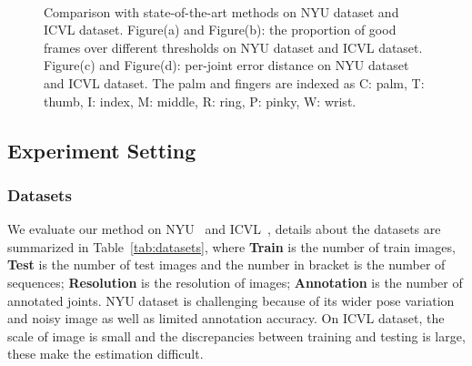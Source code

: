 \documentclass[journal,comsoc]{IEEEtran}
\let\MYoriglatexcaption\caption
\renewcommand{\caption}[2][\relax]{\MYoriglatexcaption[#2]{#2}}
\begin{document}
\begin{figure*}[t]\footnotesize
\centering
    \\
    \caption{Comparison with state-of-the-art methods on NYU dataset and ICVL dataset. Figure(a) and Figure(b): the
    proportion of good frames over different thresholds on NYU dataset and ICVL dataset. Figure(c) and Figure(d):
    per-joint error distance on NYU dataset and ICVL dataset. The palm and fingers are indexed as C: palm, T:
    thumb, I: index, M: middle, R: ring, P: pinky, W: wrist.}
    \label{fig:Results}
\end{figure*}

\subsection{Experiment Setting}\label{sec:experiment setting}
\subsubsection{Datasets}\label{sec:datasets}
We evaluate our method on NYU~\cite{tompson2014real} and ICVL~\cite{tang2014latent}, details about the datasets
are summarized in Table~\ref{tab:datasets}, where \textbf{Train} is the number of train images, \textbf{Test}
is the number of test images and the number in bracket is the number of sequences; \textbf{Resolution} is the resolution
of images; \textbf{Annotation} is the number of annotated joints.
NYU dataset is challenging because of its wider pose variation and noisy image as well as limited annotation accuracy.
On ICVL dataset, the scale of image is small and the discrepancies between training and testing is large, these make
the estimation difficult.
\end{document}
